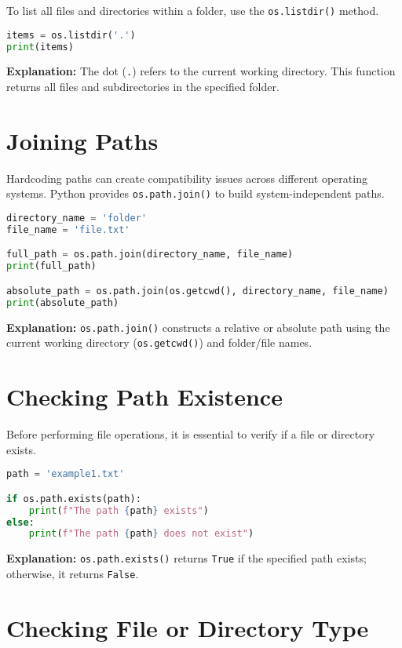 To list all files and directories within a folder, use the \texttt{os.listdir()} method.

\begin{lstlisting}[language=Python]
items = os.listdir('.')
print(items)
\end{lstlisting}

\textbf{Explanation:} The dot (\texttt{.}) refers to the current working directory. This function returns all files and subdirectories in the specified folder.

\section{Joining Paths}

Hardcoding paths can create compatibility issues across different operating systems. Python provides \texttt{os.path.join()} to build system-independent paths.

\begin{lstlisting}[language=Python]
directory_name = 'folder'
file_name = 'file.txt'

full_path = os.path.join(directory_name, file_name)
print(full_path)

absolute_path = os.path.join(os.getcwd(), directory_name, file_name)
print(absolute_path)
\end{lstlisting}

\textbf{Explanation:} \texttt{os.path.join()} constructs a relative or absolute path using the current working directory (\texttt{os.getcwd()}) and folder/file names.

\section{Checking Path Existence}

Before performing file operations, it is essential to verify if a file or directory exists.

\begin{lstlisting}[language=Python]
path = 'example1.txt'

if os.path.exists(path):
    print(f"The path {path} exists")
else:
    print(f"The path {path} does not exist")
\end{lstlisting}

\textbf{Explanation:} \texttt{os.path.exists()} returns \texttt{True} if the specified path exists; otherwise, it returns \texttt{False}.

\section{Checking File or Directory Type}

